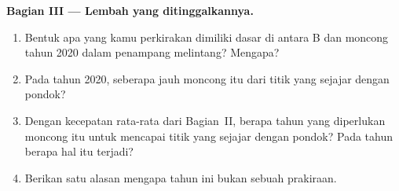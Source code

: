 \begin{problem}
\noindent\textbf{Bagian III --- Lembah yang ditinggalkannya.}\par\nopagebreak
\begin{enumerate}[resume, beginpenalty=10000]
  \item Bentuk apa yang kamu perkirakan dimiliki dasar  di antara B
        dan moncong tahun 2020 dalam penampang melintang? Mengapa?
  \item Pada tahun 2020, seberapa jauh moncong itu dari titik yang sejajar
        dengan pondok?
  \item Dengan kecepatan rata-rata dari Bagian~II, berapa tahun yang
        diperlukan moncong itu untuk mencapai titik yang sejajar dengan
        pondok? Pada tahun berapa hal itu terjadi?
  \item Berikan satu alasan mengapa tahun ini bukan sebuah prakiraan.
\end{enumerate}
\end{problem}
